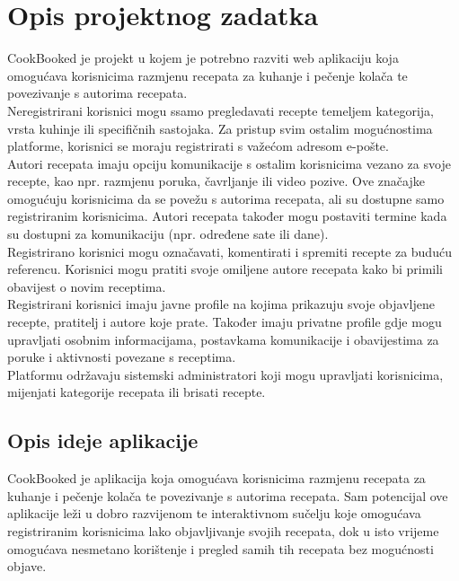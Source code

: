 \chapter{Opis projektnog zadatka}
		
		\noindent CookBooked je projekt u kojem je potrebno razviti web aplikaciju koja omogućava korisnicima razmjenu recepata za kuhanje i pečenje kolača te povezivanje s autorima recepata. \\
		
		\noindent Neregistrirani korisnici mogu ssamo pregledavati recepte temeljem kategorija, vrsta kuhinje ili specifičnih sastojaka. Za pristup svim ostalim mogućnostima platforme, korisnici se moraju registrirati s važećom adresom e-pošte. \\
		
		\noindent Autori recepata imaju opciju komunikacije s ostalim korisnicima vezano za svoje recepte, kao npr. razmjenu poruka, čavrljanje ili video pozive. Ove značajke omogućuju korisnicima da se povežu s autorima recepata, ali su dostupne samo registriranim korisnicima. Autori recepata također mogu postaviti termine kada su dostupni za komunikaciju (npr. određene sate ili dane). \\
		
		\noindent Registrirano korisnici mogu označavati, komentirati i spremiti recepte za buduću referencu. Korisnici mogu pratiti svoje omiljene autore recepata kako bi primili obavijest o novim receptima.\\
		
		\noindent Registrirani korisnici imaju javne profile na kojima prikazuju svoje objavljene recepte, pratitelj i autore koje prate. Također imaju privatne profile gdje mogu upravljati osobnim informacijama, postavkama komunikacije i obavijestima za poruke i aktivnosti povezane s receptima. \\
		
		\noindent Platformu održavaju sistemski administratori koji mogu upravljati korisnicima, mijenjati kategorije recepata ili brisati recepte.
		
		
		
		\section{Opis ideje aplikacije}

		\noindent CookBooked je aplikacija koja omogućava korisnicima razmjenu recepata za kuhanje i pečenje kolača te povezivanje s autorima recepata. Sam potencijal ove aplikacije leži u dobro razvijenom te interaktivnom sučelju koje omogućava registriranim korisnicima lako objavljivanje svojih recepata, dok u isto vrijeme omogućava nesmetano korištenje i pregled samih tih recepata bez mogućnosti objave.\\
		
